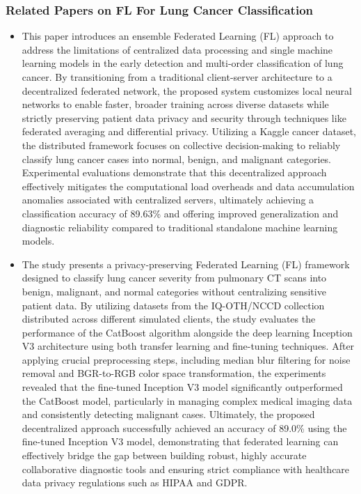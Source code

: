 \subsubsection{Related Papers on FL For Lung Cancer Classification}
\begin{itemize} \itemsep 10pt
	\item This paper introduces an ensemble Federated Learning (FL) approach to address the limitations of centralized data processing and single machine learning models in the early detection and multi-order classification of lung cancer. By transitioning from a traditional client-server architecture to a decentralized federated network, the proposed system customizes local neural networks to enable faster, broader training across diverse datasets while strictly preserving patient data privacy and security through techniques like federated averaging and differential privacy. Utilizing a Kaggle cancer dataset, the distributed framework focuses on collective decision-making to reliably classify lung cancer cases into normal, benign, and malignant categories. Experimental evaluations demonstrate that this decentralized approach effectively mitigates the computational load overheads and data accumulation anomalies associated with centralized servers, ultimately achieving a classification accuracy of 89.63\% and offering improved generalization and diagnostic reliability compared to traditional standalone machine learning models. \cite{umam2023}
	\item The study  presents a privacy-preserving Federated Learning (FL) framework designed to classify lung cancer severity from pulmonary CT scans into benign, malignant, and normal categories without centralizing sensitive patient data. By utilizing datasets from the IQ-OTH/NCCD collection distributed across different simulated clients, the study evaluates the performance of the CatBoost algorithm alongside the deep learning Inception V3 architecture using both transfer learning and fine-tuning techniques. After applying crucial preprocessing steps, including median blur filtering for noise removal and BGR-to-RGB color space transformation, the experiments revealed that the fine-tuned Inception V3 model significantly outperformed the CatBoost model, particularly in managing complex medical imaging data and consistently detecting malignant cases. Ultimately, the proposed decentralized approach successfully achieved an accuracy of 89.0\% using the fine-tuned Inception V3 model, demonstrating that federated learning can effectively bridge the gap between building robust, highly accurate collaborative diagnostic tools and ensuring strict compliance with healthcare data privacy regulations such as HIPAA and GDPR. \cite{BEHURIA2025279}

\end{itemize}
